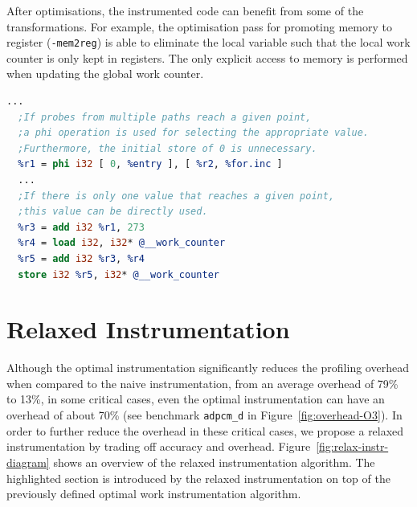 After optimisations, the instrumented code can benefit from some of the transformations.
For example, the optimisation pass for promoting memory to register (\texttt{-mem2reg}) is able to eliminate the local variable such that the local work counter is only kept in registers.
The only explicit access to memory is performed when updating the global work counter.

\begin{lstlisting}[language=llvm,style=nasm,caption={An illustrative example of how \texttt{-mem2reg} can optimise the instrumented code.}, label={lst:instr_opt_probe}]
  ...
  ;If probes from multiple paths reach a given point,
  ;a phi operation is used for selecting the appropriate value.
  ;Furthermore, the initial store of 0 is unnecessary.
  %r1 = phi i32 [ 0, %entry ], [ %r2, %for.inc ]
  ...
  ;If there is only one value that reaches a given point,
  ;this value can be directly used.
  %r3 = add i32 %r1, 273
  %r4 = load i32, i32* @__work_counter
  %r5 = add i32 %r3, %r4
  store i32 %r5, i32* @__work_counter
\end{lstlisting}

\section{Relaxed Instrumentation}

Although the optimal instrumentation significantly reduces the profiling overhead when compared to the naive instrumentation, from an average overhead of 79\% to 13\%, in some critical cases, even the optimal instrumentation can have an overhead of about 70\% (see benchmark \texttt{adpcm\_d} in Figure~\ref{fig:overhead-O3}).
In order to further reduce the overhead in these critical cases, we propose a relaxed instrumentation by trading off accuracy and overhead.
Figure~\ref{fig:relax-instr-diagram} shows an overview of the relaxed instrumentation algorithm.
The highlighted section is introduced by the relaxed instrumentation on top of the previously defined optimal work instrumentation algorithm.

